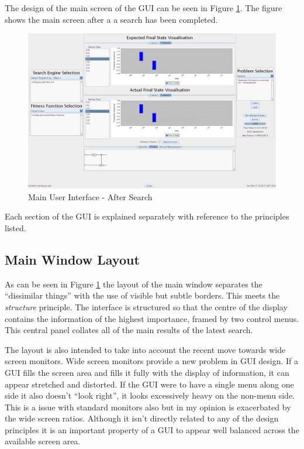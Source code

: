 The design of the main screen of the GUI can be seen in Figure \ref{fig:MainGUIDesign}.
The figure shows the main screen after a a search has been completed.

\begin{figure}
 \includegraphics[width=\textwidth]{GUIDesign.png}
\caption{Main User Interface - After Search}
\label{fig:MainGUIDesign}
\end{figure}

Each section of the GUI is explained separately with reference to the principles listed.

\subsection{Main Window Layout}
As can be seen in Figure \ref{fig:MainGUIDesign} the layout of the main window separates the ``dissimilar things'' with the use of visible but subtle borders.
This meets the \emph{structure} principle.
The interface is structured so that the centre of the display contains the information of the highest importance, framed  by two control menus.
This central panel collates all of the main results of the latest search.

The layout is also intended to take into account the recent move towards wide screen monitors.
Wide screen monitors provide a new problem in GUI design.
If a GUI fills the screen area and fills it fully with the display of information, it can appear stretched and distorted.
If the GUI were to have a single menu along one side it also doesn't ``look right'', it looks excessively heavy on the non-menu side.
This is a issue with standard monitors also but in my opinion is exacerbated by the wide screen ratios.
Although it isn't directly related to any of the design principles it is an important property of a GUI to appear well balanced across the available screen area.

